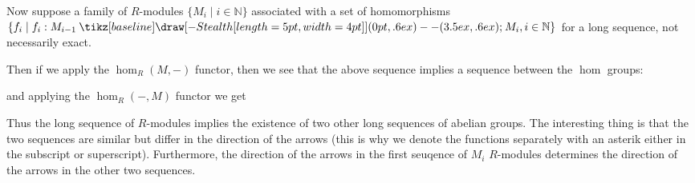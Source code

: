 \documentclass[12pt,letterpaper]{algebra_book}
\renewcommand{\to}{\mathbin{\tikz[baseline] \draw[-{Stealth[length=5pt,width=4pt]}] (0pt,.6ex) -- (3.5ex,.6ex);}}
\theoremstyle{definition}
\begin{document}
Now suppose a family of $R$-modules $\{M_i \mid i \in \mathbb{N}\}$ associated with a
set of homomorphisms $\{f_i \mid f_i :M_{i-1} \to M_i, i
\in \mathbb{N}\}$ for a long sequence, not necessarily exact.
\begin{center}
\end{center}
Then if we apply the $\hom_R(M, -)$ functor,
then we see that the above sequence implies a sequence between the
$\hom$ groups:
\begin{center}
\end{center}
and applying the $\hom_R(-, M)$ functor we get 
\begin{center}
\end{center}

Thus the long sequence of $R$-modules implies the existence of two other long
sequences of abelian groups. The interesting thing is that the two sequences are
similar but differ in the direction of the arrows (this is why we
denote the functions separately with an asterik either in the
subscript or superscript). Furthermore,
the direction of the arrows in the first seuqence of $M_i$
$R$-modules determines the direction of the arrows in the other
two sequences. 
\end{document}
